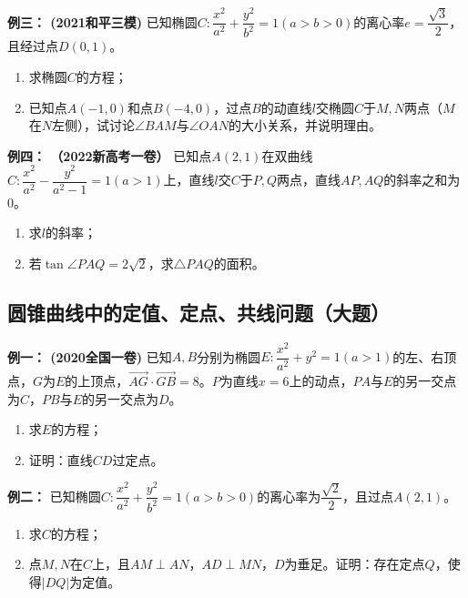 \documentclass{article}
\begin{document}
\newpage

\textbf{例三： (2021和平三模)} 已知椭圆$C:\dfrac{x^2}{a^2}+\dfrac{y^2}{b^2}=1(a>b>0)$的离心率$e=\dfrac{\sqrt{3}}{2}$，且经过点$D(0,1)$。
\begin{enumerate}[label=(\Roman*)]
    \item 求椭圆$C$的方程；
    \item 已知点$A(-1,0)$和点$B(-4,0)$，过点$B$的动直线$l$交椭圆$C$于$M,N$两点（$M$在$N$左侧），试讨论$\angle BAM$与$\angle OAN$的大小关系，并说明理由。
\end{enumerate}

\vspace{18\baselineskip}

\textbf{例四： （2022新高考一卷）} 已知点$A(2,1)$在双曲线$C:\dfrac{x^2}{a^2}-\dfrac{y^2}{a^2-1}=1(a>1)$上，直线$l$交$C$于$P,Q$两点，直线$AP,AQ$的斜率之和为$0$。
\begin{enumerate}[label=(\arabic*)]
    \item 求$l$的斜率；
    \item 若$\tan\angle PAQ=2\sqrt{2}$，求$\triangle PAQ$的面积。
\end{enumerate}

\newpage

\subsection{圆锥曲线中的定值、定点、共线问题（大题）}

\textbf{例一： (2020全国一卷)} 已知$A,B$分别为椭圆$E:\dfrac{x^2}{a^2} + y^2 = 1(a>1)$的左、右顶点，$G$为$E$的上顶点，$\overrightarrow{AG} \cdot \overrightarrow{GB} = 8$。$P$为直线$x=6$上的动点，$PA$与$E$的另一交点为$C$，$PB$与$E$的另一交点为$D$。
\begin{enumerate}[label=(\arabic*)]
    \item 求$E$的方程；
    \item 证明：直线$CD$过定点。
\end{enumerate}

\vspace{18\baselineskip}

\textbf{例二： } 已知椭圆$C:\dfrac{x^2}{a^2} + \dfrac{y^2}{b^2} = 1(a>b>0)$的离心率为$\dfrac{\sqrt{2}}{2}$，且过点$A(2,1)$。
\begin{enumerate}[label=(\arabic*)]
    \item 求$C$的方程；
    \item 点$M,N$在$C$上，且$AM \perp AN$，$AD \perp MN$，$D$为垂足。证明：存在定点$Q$，使得$|DQ|$为定值。
\end{enumerate}
\end{document}
